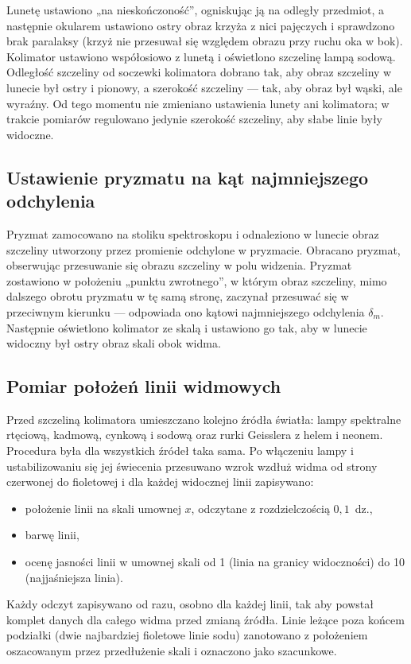 \documentclass[12pt, a4paper]{article}
\begin{document}
Lunetę ustawiono „na nieskończoność”, ogniskując ją na odległy przedmiot, a następnie
okularem ustawiono ostry obraz krzyża z nici pajęczych i sprawdzono brak paralaksy
(krzyż nie przesuwał się względem obrazu przy ruchu oka w bok). Kolimator ustawiono
współosiowo z lunetą i oświetlono szczelinę lampą sodową. Odległość szczeliny od soczewki
kolimatora dobrano tak, aby obraz szczeliny w lunecie był ostry i pionowy, a szerokość
szczeliny --- tak, aby obraz był wąski, ale wyraźny. Od tego momentu nie zmieniano
ustawienia lunety ani kolimatora; w trakcie pomiarów regulowano jedynie szerokość
szczeliny, aby słabe linie były widoczne.

\subsection{Ustawienie pryzmatu na kąt najmniejszego odchylenia}

Pryzmat zamocowano na stoliku spektroskopu i odnaleziono w lunecie obraz szczeliny
utworzony przez promienie odchylone w pryzmacie. Obracano pryzmat, obserwując przesuwanie
się obrazu szczeliny w polu widzenia. Pryzmat zostawiono w położeniu „punktu zwrotnego”,
w którym obraz szczeliny, mimo dalszego obrotu pryzmatu w tę samą stronę, zaczynał
przesuwać się w przeciwnym kierunku --- odpowiada ono kątowi najmniejszego odchylenia
$\delta_m$. Następnie oświetlono kolimator ze skalą i ustawiono go tak, aby w lunecie
widoczny był ostry obraz skali obok widma.

\subsection{Pomiar położeń linii widmowych}

Przed szczeliną kolimatora umieszczano kolejno źródła światła: lampy spektralne rtęciową,
kadmową, cynkową i sodową oraz rurki Geisslera z helem i neonem. Procedura była dla
wszystkich źródeł taka sama. Po włączeniu lampy i ustabilizowaniu się jej świecenia
przesuwano wzrok wzdłuż widma od strony czerwonej do fioletowej i dla każdej widocznej
linii zapisywano:
\begin{itemize}
    \item położenie linii na skali umownej $x$, odczytane z rozdzielczością $0{,}1$~dz.,
    \item barwę linii,
    \item ocenę jasności linii w umownej skali od 1 (linia na granicy widoczności)
          do 10 (najjaśniejsza linia).
\end{itemize}
Każdy odczyt zapisywano od razu, osobno dla każdej linii, tak aby powstał komplet danych
dla całego widma przed zmianą źródła. Linie leżące poza końcem podziałki
(dwie najbardziej fioletowe linie sodu) zanotowano z położeniem oszacowanym przez
przedłużenie skali i oznaczono jako szacunkowe.
\end{document}
